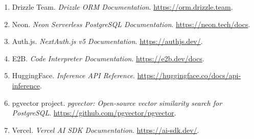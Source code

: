 \documentclass[11pt,a4paper]{report}
\begin{document}
\begin{enumerate}
  \item Drizzle Team. \emph{Drizzle ORM Documentation}. \url{https://orm.drizzle.team}.
  \item Neon. \emph{Neon Serverless PostgreSQL Documentation}. \url{https://neon.tech/docs}.
  \item Auth.js. \emph{NextAuth.js v5 Documentation}. \url{https://authjs.dev/}.
  \item E2B. \emph{Code Interpreter Documentation}. \url{https://e2b.dev/docs}.
  \item HuggingFace. \emph{Inference API Reference}. \url{https://huggingface.co/docs/api-inference}.
  \item pgvector project. \emph{pgvector: Open-source vector similarity search for PostgreSQL}. \url{https://github.com/pgvector/pgvector}.
  \item Vercel. \emph{Vercel AI SDK Documentation}. \url{https://ai-sdk.dev/}.
\end{enumerate}
\end{document}
